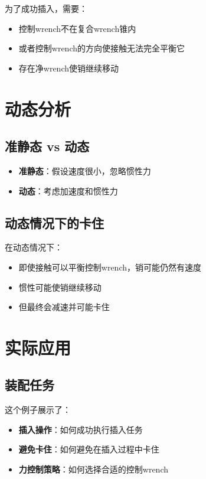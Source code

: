 \documentclass[12pt,a4paper]{article}
\begin{document}
为了成功插入，需要：

\begin{itemize}
    \item 控制wrench不在复合wrench锥内
    \item 或者控制wrench的方向使接触无法完全平衡它
    \item 存在净wrench使销继续移动
\end{itemize}

\section{动态分析}

\subsection{准静态 vs 动态}

\begin{itemize}
    \item \textbf{准静态}：假设速度很小，忽略惯性力
    \item \textbf{动态}：考虑加速度和惯性力
\end{itemize}

\subsection{动态情况下的卡住}

在动态情况下：
\begin{itemize}
    \item 即使接触可以平衡控制wrench，销可能仍然有速度
    \item 惯性可能使销继续移动
    \item 但最终会减速并可能卡住
\end{itemize}

\section{实际应用}

\subsection{装配任务}

这个例子展示了：

\begin{itemize}
    \item \textbf{插入操作}：如何成功执行插入任务
    \item \textbf{避免卡住}：如何避免在插入过程中卡住
    \item \textbf{力控制策略}：如何选择合适的控制wrench
\end{itemize}
\end{document}
